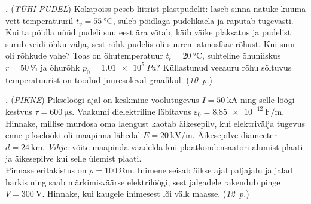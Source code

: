 \documentclass[11pt,a5paper]{article}
\newcommand{\numb}[1]{\vspace{5pt}\textbf{\large #1}}
\newcommand{\nimi}[1]{(\textsl{\small #1})}
\newcommand{\punktid}[1]{(\emph{#1~p.})}
\newcounter{ylesanne}
\newcommand{\yl}[1]{\addtocounter{ylesanne}{1}\numb{\theylesanne.} \nimi{#1} \newblock{}}
\newcommand{\autor}[1]{}%
\begin{document}
\newpage
\yl{TÜHI PUDEL}
Kokapoiss peseb liitrist plastpudelit: laseb sinna natuke kuuma vett temperatuuril $t_v=\qty{55}{\celsius}$, suleb pöidlaga pudelikaela ja raputab tugevasti. Kui ta pöidla nüüd pudeli suu eest ära võtab, käib väike plaksatus ja pudelist surub veidi õhku välja, sest rõhk pudelis oli suurem atmosfäärirõhust. Kui suur oli rõhkude vahe? Toas on õhutemperatuur $t_t=\qty{20}{\celsius}$, suhteline õhuniiskus $r=\qty{50}{\percent}$ ja õhurõhk $p_0=\SI{1.01e5}{Pa}$? Küllastunud veeauru rõhu sõltuvus temperatuurist on toodud juuresoleval graafikul.
\punktid{10} \autor{Jaan Kalda}
\begin{figure}[h]
  \vspace{-0.5em}
  {
  }
  \vspace{-1em}
\end{figure}

\yl{PIKNE}
Pikselöögi ajal on keskmine voolutugevus $I=\qty{50}{\kA}$ ning selle löögi kestvus
$\tau=\qty{600}{\us}$. Vaakumi dielektriline läbitavus $\varepsilon_0=\qty{8.85e-12}{\F\per\m}$.\\
\osa Hinnake, millise murdosa oma laengust kaotab äikesepilv, kui elektrivälja tugevus enne pikselööki oli maapinna lähedal $E=\qty{20}{\kV\per\m}$.  Äikesepilve diameeter $d=\qty{24}{\km}$. \emph{Vihje}: võite maapinda vaadelda kui plaatkondensaatori alumist plaati ja äikesepilve kui selle ülemist plaati.\\
\osa Pinnase eritakistus on $\rho = \qty{100}{\ohm\m}$. Inimene seisab äikse ajal paljajalu ja jalad harkis ning saab märkimisväärse elektrilöögi, sest jalgadele rakendub pinge $V=\qty{300}{\V}$. Hinnake, kui kaugele inimesest lõi välk maasse.
\punktid{12} \autor{Jaan Kalda}
\end{document}
